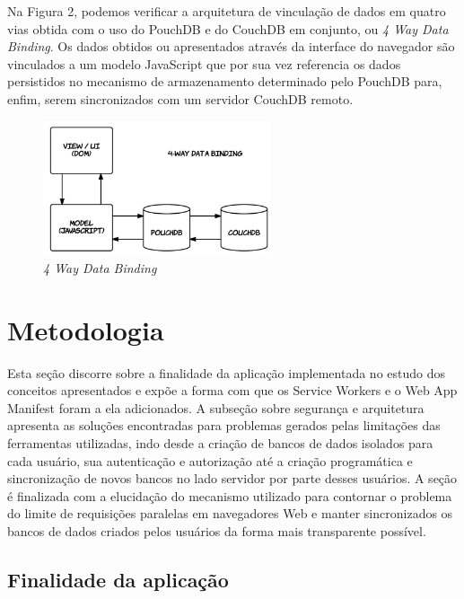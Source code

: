 \documentclass[
	article,			%
	11pt,				%
	oneside,			%
	a4paper,			%
	english,			%
	brazil,				%
	sumario=tradicional
	]{abntex2}
\begin{document}
Na Figura 2, podemos verificar a arquitetura de vinculação de dados em quatro vias obtida com o uso do PouchDB e do CouchDB em conjunto, ou \textit{4 Way Data Binding}. Os dados obtidos ou apresentados através da interface do navegador são vinculados a um modelo JavaScript que por sua vez referencia os dados persistidos no mecanismo de armazenamento determinado pelo PouchDB para, enfim, serem sincronizados com um servidor CouchDB remoto.

\begin{figure}[H]
	\label{4 Way Data Binding}
	\centering
	\caption{\textit{4 Way Data Binding}}
	\includegraphics[width=0.6\textwidth]{figures/4way-binding}
\end{figure}


\section{Metodologia}

Esta seção discorre sobre a finalidade da aplicação implementada no estudo dos conceitos apresentados e expõe a forma com que os Service Workers e o Web App Manifest foram a ela adicionados. A subseção sobre segurança e arquitetura apresenta as soluções encontradas para problemas gerados pelas limitações das ferramentas utilizadas, indo desde a criação de bancos de dados isolados para cada usuário, sua autenticação e autorização até a criação programática e sincronização de novos bancos no lado servidor por parte desses usuários. A seção é finalizada com a elucidação do mecanismo utilizado para contornar o problema do limite de requisições paralelas em navegadores Web e manter sincronizados os bancos de dados criados pelos usuários da forma mais transparente possível.

\subsection{Finalidade da aplicação}
\end{document}
